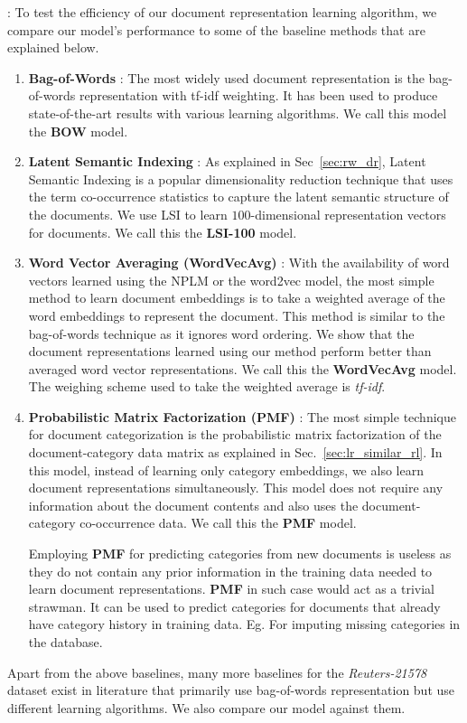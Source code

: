  : To test the efficiency of our document representation learning algorithm, we compare our model's performance to some of the baseline methods that are explained below.
\begin{enumerate}
\item \textbf{Bag-of-Words} : 
The most widely used document representation is the bag-of-words representation with tf-idf weighting. It has been used to produce state-of-the-art results with various learning algorithms. We call this model the \textbf{BOW} model.

\item \textbf{Latent Semantic Indexing} : 
As explained in Sec~\ref{sec:rw_dr}, Latent Semantic Indexing is a popular dimensionality reduction technique that uses the term co-occurrence statistics to capture the latent semantic structure of the documents. We use LSI to learn $100$-dimensional representation vectors for documents. We call this the \textbf{LSI-100} model.

\item \textbf{Word Vector Averaging (WordVecAvg)} : 
With the availability of word vectors learned using the NPLM or the word2vec model, the most simple method to learn document embeddings is to take a weighted average of the word embeddings to represent the document. This method is similar to the bag-of-words technique as it ignores word ordering. We show that the document representations learned using our method perform better than averaged word vector representations. We call this the \textbf{WordVecAvg} model. The weighing scheme used to take the weighted average is \emph{tf-idf}.

\item \textbf{Probabilistic Matrix Factorization (PMF)} : 
The most simple technique for document categorization is the probabilistic matrix factorization of the document-category data matrix as explained in Sec.~\ref{sec:lr_similar_rl}. In this model, instead of learning only category embeddings, we also learn document representations simultaneously. This model does not require any information about the document contents and also uses the document-category co-occurrence data. We call this the \textbf{PMF} model.

Employing \textbf{PMF} for predicting categories from new documents is useless as they do not contain any prior information in the training data needed to learn document representations. \textbf{PMF} in such case would act as a trivial strawman. It can be used to predict categories for documents that already have category history in training data. Eg. For imputing missing categories in the database. 

\end{enumerate}
Apart from the above baselines, many more baselines for the \emph{Reuters-21578} dataset exist in literature that primarily use bag-of-words representation but use different learning algorithms. We also compare our model against them.

